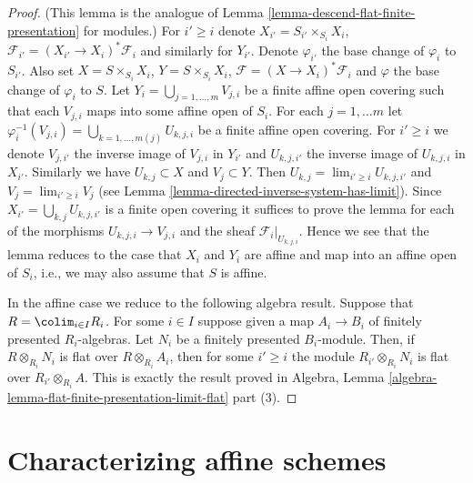 \begin{proof}
(This lemma is the analogue of
Lemma \ref{lemma-descend-flat-finite-presentation}
for modules.)
For $i' \geq i$ denote $X_{i'} = S_{i'} \times_{S_i} X_i$,
$\mathcal{F}_{i'} = (X_{i'} \to X_i)^*\mathcal{F}_i$ and similarly
for $Y_{i'}$. Denote $\varphi_{i'}$ the base change
of $\varphi_i$ to $S_{i'}$. Also set $X = S \times_{S_i} X_i$,
$Y =S \times_{S_i} X_i$, $\mathcal{F} = (X \to X_i)^*\mathcal{F}_i$
and $\varphi$ the base change of $\varphi_i$ to $S$.
Let $Y_i = \bigcup_{j = 1, \ldots, m} V_{j, i}$ be a finite affine open
covering such that each $V_{j, i}$ maps into some affine open of $S_i$.
For each $j = 1, \ldots m$ let
$\varphi_i^{-1}(V_{j, i}) = \bigcup_{k = 1, \ldots, m(j)} U_{k, j, i}$
be a finite affine open covering. For $i' \geq i$ we denote
$V_{j, i'}$ the inverse image of $V_{j, i}$ in $Y_{i'}$ and
$U_{k, j, i'}$ the inverse image of $U_{k, j, i}$ in $X_{i'}$.
Similarly we have $U_{k, j} \subset X$ and $V_j \subset Y$.
Then $U_{k, j} = \lim_{i' \geq i} U_{k, j, i'}$
and $V_j = \lim_{i' \geq i} V_j$
(see Lemma \ref{lemma-directed-inverse-system-has-limit}).
Since $X_{i'} = \bigcup_{k, j} U_{k, j, i'}$ is a finite open covering
it suffices to prove the lemma for each of the morphisms
$U_{k, j, i} \to V_{j, i}$ and the sheaf $\mathcal{F}_i|_{U_{k, j, i}}$.
Hence we see that the lemma reduces to the case that $X_i$ and
$Y_i$ are affine and map into an affine open of $S_i$, i.e., we
may also assume that $S$ is affine.

\medskip\noindent
In the affine case we reduce to the following algebra result.
Suppose that $R = \colim_{i \in I} R_i$. For some $i \in I$
suppose given a map $A_i \to B_i$ of finitely presented $R_i$-algebras.
Let $N_i$ be a finitely presented $B_i$-module.
Then, if $R \otimes_{R_i} N_i$ is flat over $R \otimes_{R_i} A_i$,
then for some $i' \geq i$ the module
$R_{i'} \otimes_{R_i} N_i$ is flat over $R_{i'} \otimes_{R_i} A$.
This is exactly the result proved in
Algebra,
Lemma \ref{algebra-lemma-flat-finite-presentation-limit-flat} part (3).
\end{proof}












\section{Characterizing affine schemes}
\label{section-affine}

